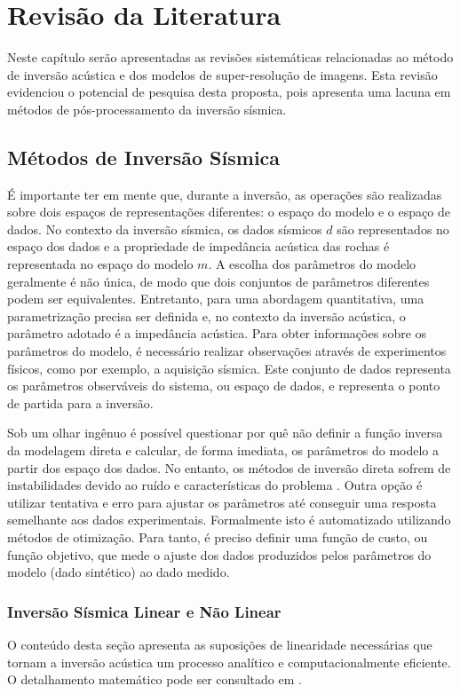 \chapter{Revisão da Literatura}
\label{cap:3revisaoliteraria}

Neste capítulo serão apresentadas as revisões sistemáticas relacionadas
ao método de inversão acústica e dos modelos de super-resolução de imagens.
Esta revisão evidenciou o potencial de pesquisa desta proposta, pois
apresenta uma lacuna em métodos de pós-processamento da inversão sísmica.

\section{Métodos de Inversão Sísmica}
É importante ter em mente que, durante a inversão, as operações são realizadas
sobre dois espaços de representações diferentes: o espaço do modelo e o espaço de dados.
No contexto da inversão sísmica, os dados sísmicos $d$ são representados no espaço
dos dados e a propriedade de impedância acústica das rochas é representada
no espaço do modelo $m$.
A escolha dos parâmetros do modelo geralmente é não única, de modo que dois conjuntos
de parâmetros diferentes podem ser equivalentes.
Entretanto, para uma abordagem quantitativa, uma parametrização precisa ser definida \cite{tarantola} e,
no contexto da inversão acústica, o parâmetro adotado é a impedância acústica.
Para obter informações sobre os parâmetros do modelo, é necessário
realizar observações através de experimentos físicos, como por exemplo, a
aquisição sísmica. Este conjunto de dados representa os parâmetros observáveis do sistema,
ou espaço de dados, e representa o ponto de partida para a inversão.

Sob um olhar ingênuo é possível questionar por quê não definir a
função inversa da modelagem direta e calcular, de forma imediata,
os parâmetros do modelo a partir dos espaço dos dados.
No entanto, os métodos de inversão direta sofrem de instabilidades
devido ao ruído e características do problema \citep[p. 50]{sen_livro}. Outra
opção é utilizar tentativa e erro para ajustar os parâmetros até conseguir uma
resposta semelhante aos dados experimentais. Formalmente isto é automatizado
utilizando métodos de otimização. Para tanto, é preciso definir uma função de
custo, ou função objetivo, que mede o ajuste dos dados produzidos pelos
parâmetros do modelo (dado sintético) ao dado medido.

\subsection{Inversão Sísmica Linear e Não Linear}
O conteúdo desta seção apresenta as suposições de linearidade necessárias
que tornam a inversão acústica um processo analítico e computacionalmente
eficiente. O detalhamento matemático pode ser consultado em \cite{Figueiredo2014}.

